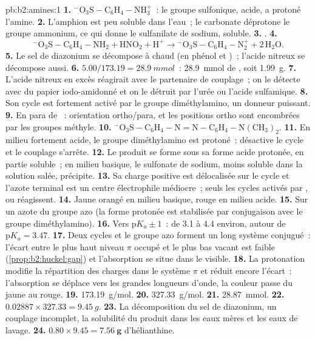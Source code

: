 \begin{solution}{pb:b2:amines:1}
\textbf{1.} $\mathrm{{}^-O_3S{-}C_6H_4{-}NH_3^+}$~: le groupe sulfonique, acide, a protoné l'amine.
\textbf{2.} L'amphion est peu soluble dans l'eau~; le carbonate déprotone le groupe ammonium, ce qui
donne le sulfanilate de sodium, soluble.
\textbf{3.} .
\textbf{4.}
\[
  \mathrm{{}^-O_3S{-}C_6H_4{-}NH_2 + HNO_2 + H^+ \to {}^-O_3S{-}C_6H_4{-}N_2^+ + 2\,H_2O} .
\]
\textbf{5.} Le sel de diazonium se décompose à chaud (en phénol et )~; l'acide nitreux
se décompose aussi.
\textbf{6.} $5.00/173.19 = \qty{28.9}{mmol}$~: \qty{28.9}{mmol} de , soit \qty{1.99}{g}.
\textbf{7.} L'acide nitreux en excès réagirait avec le partenaire de couplage~; on le détecte avec du papier
iodo-amidonné et on le détruit par l'urée ou l'acide sulfamique.
\textbf{8.} Son cycle est fortement activé par le groupe diméthylamino, un donneur puissant.
\textbf{9.} En para de ~: orientation ortho/para, et les positions ortho sont encombrées par les
groupes méthyle.
\textbf{10.} $\mathrm{{}^-O_3S{-}C_6H_4{-}N{=}N{-}C_6H_4{-}N(CH_3)_2}$.
\textbf{11.} En milieu fortement acide, le groupe diméthylamino est protoné~:  désactive le cycle
et le couplage s'arrête.
\textbf{12.} Le produit se forme sous sa forme acide protonée, en partie soluble~; en milieu basique, le
sulfonate de sodium, moins soluble dans la solution salée, précipite.
\textbf{13.} Sa charge positive est délocalisée sur le cycle et l'azote terminal est un centre électrophile
médiocre~; seuls les cycles activés par ,  ou  réagissent.
\textbf{14.} Jaune orangé en milieu basique, rouge en milieu acide.
\textbf{15.} Sur un azote du groupe azo (la forme protonée est stabilisée par conjugaison avec le
groupe diméthylamino).
\textbf{16.} Vers $\mathrm pK_a \pm 1$~: de 3.1 à 4.4 environ, autour de $\mathrm pK_a = 3.47$.
\textbf{17.} Deux cycles et le groupe azo forment un long système conjugué~: l'écart entre le plus haut niveau
$\pi$ occupé et le plus bas vacant est faible (\cref{prop:b2:huckel:gap}) et l'absorption
se situe dans le visible.
\textbf{18.} La protonation modifie la répartition des charges dans le système $\pi$ et réduit encore l'écart~:
l'absorption se déplace vers les grandes longueurs d'onde, la couleur passe du jaune au rouge.
\textbf{19.} \qty{173.19}{g/mol}.
\textbf{20.} \qty{327.33}{g/mol}.
\textbf{21.} \qty{28.87}{mmol}.
\textbf{22.} $0.02887 \times 327.33 = \qty{9.45}{g}$.
\textbf{23.} La décomposition du sel de diazonium, un couplage incomplet, la solubilité du produit dans
les eaux mères et les eaux de lavage.
\textbf{24.} $0.80 \times 9.45 = \boldsymbol{\qty{7.56}{g}}$ d'hélianthine.
\end{solution}
